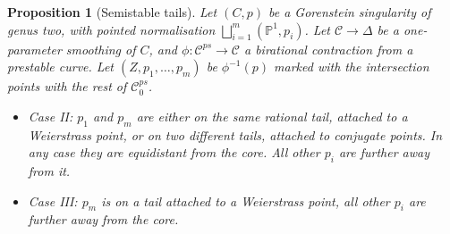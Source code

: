 \documentclass[11pt]{amsart}
\newcommand{\PP}{\mathbb P}
\renewcommand{\to}{\rightarrow}
\newcommand{\dvr}{\Delta}
\theoremstyle{plain}
\newtheorem{prop}[thm]{Proposition}
\theoremstyle{definition}
\begin{document}
\begin{prop}[Semistable tails] Let $(C,p)$ be a Gorenstein singularity of genus two, with pointed normalisation $\bigsqcup_{i=1}^m(\PP^1,p_i)$. Let $\mathcal C\to\dvr$ be a one-parameter smoothing of $C$, and $\phi\colon\mathcal C^{ps}\to\mathcal C$ a birational contraction from a prestable curve. Let $(Z,p_1,\ldots,p_m)$ be $\phi^{-1}(p)$ marked with the intersection points with the rest of $\mathcal C^{ps}_0$.
 \begin{itemize}[leftmargin=.5cm]
  \item Case II: $p_1$ and $p_m$ are either on the same rational tail, attached to a Weierstrass point, or on two different tails, attached to conjugate points. In any case they are equidistant from the core. All other $p_i$ are further away from it.
  \item Case III: $p_m$ is on a tail attached to a Weierstrass point, all other $p_i$ are further away from the core.
 \end{itemize}
\end{prop}
\end{document}
